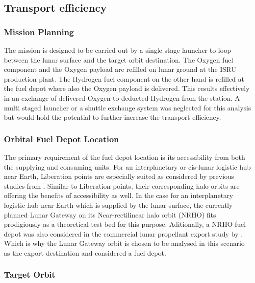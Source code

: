 \documentclass[utf8]{FrontiersinHarvard} %
\begin{document}
\subsection{Transport efficiency}
\label{sec:B}

\subsubsection{Mission Planning}
\label{sec:mission-planning}

The mission is designed to be carried out by a single stage launcher to loop between the lunar surface and the target orbit destination.
The Oxygen fuel component and the Oxygen payload are refilled on lunar ground at the ISRU production plant.
The Hydrogen fuel component on the other hand is refilled at the fuel depot where also the Oxygen payload is delivered.
This results effectively in an exchange of delivered Oxygen to deducted Hydrogen from the station.  
A multi staged launcher or a shuttle exchange system was neglected for this analysis but would hold the potential to further increase the transport efficiency.

\subsubsection{Orbital Fuel Depot Location}
\label{sec:fuel-depot}

The primary requirement of the fuel depot location is its accessibility from both the supplying and consuming units.
For an interplanetary or cis-lunar logistic hub near Earth, Liberation points are especially suited as considered by previous studies from \cite{Perrin2016}.
Similar to Liberation points, their corresponding halo orbits are offering the benefits of accessibility as well.
In the case for an interplanetary logistic hub near Earth which is supplied by the lunar surface, the currently planned Lunar Gateway on its Near-rectilinear halo orbit (NRHO) fits prodigiously as a theoretical test bed for this purpose.
Aditionally, a NRHO fuel depot was also considered in the commercial lunar propellant export study by \cite{Kornuta2019}.
Which is why the Lunar Gateway orbit is chosen to be analysed in this scenario as the export destination and considered a fuel depot.

\subsubsection{Target Orbit}
\end{document}
